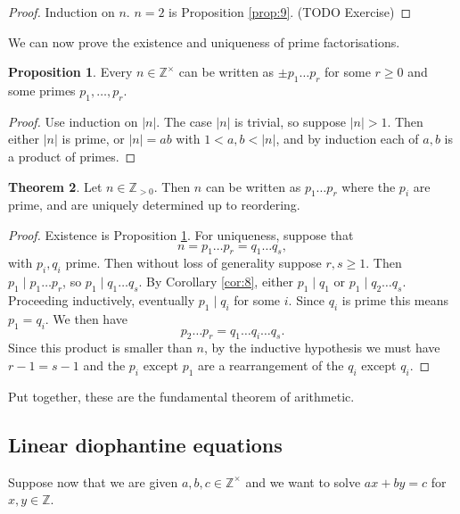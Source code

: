 \documentclass{article}
\newcommand{\Z}{\mathbb{Z}}
\newcommand{\abs}[1]{\left\lvert #1 \right\rvert}
\theoremstyle{definition}\newtheorem{definition}{Definition}
\theoremstyle{definition}\newtheorem{remark}[definition]{Remark}
\theoremstyle{definition}\newtheorem*{example}{Example}
\theoremstyle{definition}\newtheorem*{note}{Note}
\newtheorem{proposition}[definition]{Proposition}
\newtheorem{theorem}[definition]{Theorem}
\begin{document}
\begin{proof}
Induction on $ n $. $ n = 2 $ is Proposition \ref{prop:9}. (TODO Exercise)
\end{proof}

We can now prove the existence and uniqueness of prime factorisations.

\begin{proposition}
\label{prop:11}
Every $ n \in \Z^\times $ can be written as $ \pm p_1 \dots p_r $ for some $ r \ge 0 $ and some primes $ p_1, \dots, p_r $.
\end{proposition}

\begin{proof}
Use induction on $ \abs{n} $. The case $ \abs{n} $ is trivial, so suppose $ \abs{n} > 1 $. Then either $ \abs{n} $ is prime, or $ \abs{n} = ab $ with $ 1 < a, b < \abs{n} $, and by induction each of $ a, b $ is a product of primes.
\end{proof}

\begin{theorem}
Let $ n \in \Z_{> 0} $. Then $ n $ can be written as $ p_1 \dots p_r $ where the $ p_i $ are prime, and are uniquely determined up to reordering.
\end{theorem}

\begin{proof}
Existence is Proposition \ref{prop:11}. For uniqueness, suppose that
$$ n = p_1 \dots p_r = q_1 \dots q_s, $$
with $ p_i, q_i $ prime. Then without loss of generality suppose $ r, s \ge 1 $. Then $ p_1 \mid p_1 \dots p_r $, so $ p_1 \mid q_1 \dots q_s $. By Corollary \ref{cor:8}, either $ p_1 \mid q_1 $ or $ p_1 \mid q_2 \dots q_s $. Proceeding inductively, eventually $ p_1 \mid q_i $ for some $ i $. Since $ q_i $ is prime this means $ p_1 = q_i $. We then have
$$ p_2 \dots p_r = q_1 \dots q_i \dots q_s. $$
Since this product is smaller than $ n $, by the inductive hypothesis we must have $ r - 1 = s - 1 $ and the $ p_i $ except $ p_1 $ are a rearrangement of the $ q_i $ except $ q_i $.
\end{proof}

Put together, these are the fundamental theorem of arithmetic.

\subsection{Linear diophantine equations}

Suppose now that we are given $ a, b, c \in \Z^\times $ and we want to solve $ ax + by = c $ for $ x, y \in \Z $.
\end{document}
